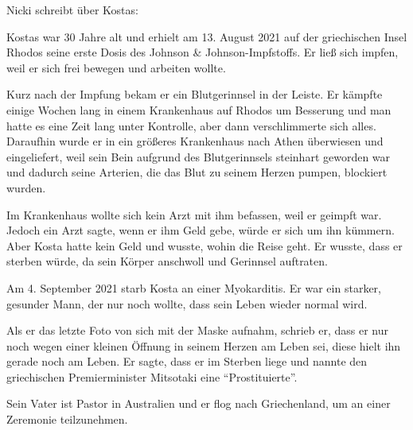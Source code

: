 Nicki schreibt über Kostas:

Kostas war 30 Jahre alt und erhielt am 13. August 2021 auf der griechischen
Insel Rhodos seine erste Dosis des Johnson \& Johnson-Impfstoffs. Er ließ sich
impfen, weil er sich frei bewegen und arbeiten wollte.

Kurz nach der Impfung bekam er ein Blutgerinnsel in der Leiste. Er kämpfte
einige Wochen lang in einem Krankenhaus auf Rhodos um Besserung und man hatte es
eine Zeit lang unter Kontrolle, aber dann verschlimmerte sich alles. Daraufhin
wurde er in ein größeres Krankenhaus nach Athen überwiesen und eingeliefert,
weil sein Bein aufgrund des Blutgerinnsels steinhart geworden war und dadurch
seine Arterien, die das Blut zu seinem Herzen pumpen, blockiert wurden.

Im Krankenhaus wollte sich kein Arzt mit ihm befassen, weil er geimpft
war. Jedoch ein Arzt sagte, wenn er ihm Geld gebe, würde er sich um ihn
kümmern. Aber Kosta hatte kein Geld und wusste, wohin die Reise geht. Er wusste,
dass er sterben würde, da sein Körper anschwoll und Gerinnsel auftraten.

Am 4. September 2021 starb Kosta an einer Myokarditis. Er war ein starker,
gesunder Mann, der nur noch wollte, dass sein Leben wieder normal wird.

Als er das letzte Foto von sich mit der Maske aufnahm, schrieb er, dass er nur
noch wegen einer kleinen Öffnung in seinem Herzen am Leben sei, diese hielt ihn
gerade noch am Leben. Er sagte, dass er im Sterben liege und nannte den
griechischen Premierminister Mitsotaki eine ``Prostituierte''.

Sein Vater ist Pastor in Australien und er flog nach Griechenland, um an einer
Zeremonie teilzunehmen.
